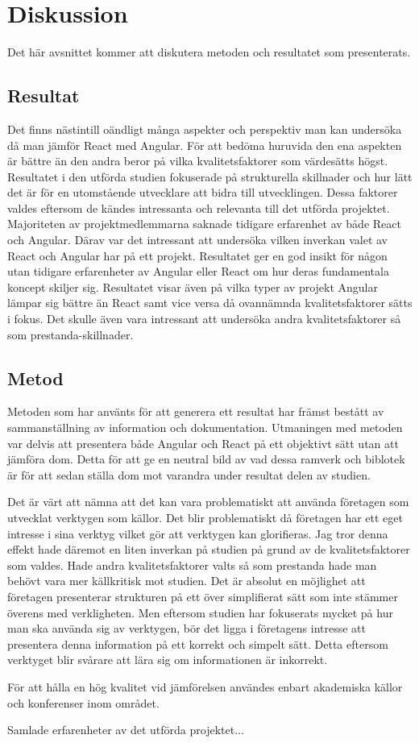 \section{Diskussion}
\label{sec:axel-discussion}
Det här avsnittet kommer att diskutera metoden och resultatet som presenterats. 

\subsection{Resultat}
\label{subsec:axel-discussion-results}
Det finns nästintill oändligt många aspekter och perspektiv man kan undersöka då man jämför React med Angular. För att bedöma huruvida den ena aspekten är bättre än den andra beror på vilka kvalitetsfaktorer som värdesätts högst. Resultatet i den utförda studien fokuserade på strukturella skillnader och hur lätt det är för en utomstående utvecklare att bidra till utvecklingen. Dessa faktorer valdes eftersom de kändes intressanta och relevanta till det utförda projektet. Majoriteten av projektmedlemmarna saknade tidigare erfarenhet av både React och Angular. Därav var det intressant att undersöka vilken inverkan valet av React och Angular har på ett projekt. Resultatet ger en god insikt för någon utan tidigare erfarenheter av Angular eller React om hur deras fundamentala koncept skiljer sig. Resultatet visar även på vilka typer av projekt Angular lämpar sig bättre än React samt vice versa då ovannämnda kvalitetsfaktorer sätts i fokus. Det skulle även vara intressant att undersöka andra kvalitetsfaktorer så som prestanda-skillnader.

\subsection{Metod}
\label{subsec:axel-discussion-method}
Metoden som har använts för att generera ett resultat har främst bestått av sammanställning av information och dokumentation. Utmaningen med metoden var delvis att presentera både Angular och React på ett objektivt sätt utan att jämföra  dom. Detta för att ge en neutral bild av vad dessa ramverk och biblotek är för att sedan ställa dom mot varandra under resultat delen av studien. 

Det är värt att nämna att det kan vara problematiskt att använda företagen som utvecklat verktygen som källor. Det blir problematiskt då företagen har ett eget intresse i sina verktyg vilket gör att verktygen kan glorifieras. Jag tror denna effekt hade däremot en liten inverkan på studien på grund av de kvalitetsfaktorer som valdes. Hade andra kvalitetsfaktorer valts så som prestanda hade man behövt vara mer källkritisk mot studien. Det är absolut en möjlighet att företagen presenterar strukturen på ett över simplifierat sätt som inte stämmer överens med verkligheten. Men eftersom studien har fokuserats mycket på hur man ska använda sig av verktygen, bör det ligga i företagens intresse att presentera denna information på ett korrekt och simpelt sätt. Detta eftersom verktyget blir svårare att lära sig om informationen är inkorrekt.

För att hålla en hög kvalitet vid jämförelsen användes enbart akademiska källor och konferenser inom området.

Samlade erfarenheter av det utförda projektet...



